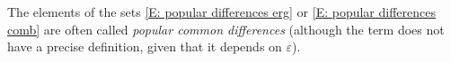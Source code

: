 \documentclass[11pt]{amsart}
\theoremstyle{definition}
\DeclareMathOperator*{\E}{\mathbb{E}}
\newcommand{\CI}{{\mathcal I}}
\newcommand{\CX}{{\mathcal X}}
\newcommand{\veps}{\varepsilon}
\newcommand{\1}{{\mathbf{1}}}
\newcommand{\floor}[1]{{\left \lfloor #1 \right \rfloor}}
\begin{document}
The elements of the sets \eqref{E: popular differences erg} or \eqref{E: popular differences comb} are often called \emph{popular common differences} (although the term does not have a precise definition, given that it depends on $\veps$).
\end{document}
